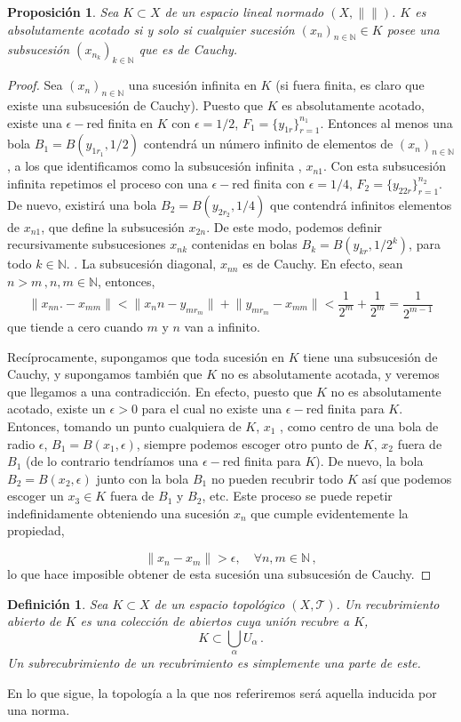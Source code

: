 \documentclass[12pt]{book}
\newtheorem{defn}{\bf Definición}[chapter]
\newtheorem{prop}{\bf Proposición}[chapter]
\def\NN{\mathbb{N}}
\newcommand{\norm}[1]{\lVert #1\rVert }
\begin{document}
\begin{prop} Sea $K\subset X$ de un espacio lineal normado $(X,\norm{})$.  $K$ es absolutamente 
acotado si y solo si cualquier sucesión $(x_n)_{n\in\NN}\in  K$ posee una subsucesión $
(x_{n_k})_{k\in \NN}$ que es de Cauchy.
\end{prop}
\begin{proof}
 Sea $(x_n)_{n\in\NN}$ una sucesión infinita en $K$ (si fuera finita, es claro que existe una 
subsucesión de Cauchy). Puesto que $K$ es absolutamente acotado, existe una $\epsilon-$red 
finita en $K$ con $\epsilon=1/2$, $F_1=\{y_{1r}\}_{r=1}^{n_1}$. Entonces al menos una bola 
$B_1=B(y_{1r_1},1/2)$ contendrá un número infinito de elementos de $(x_n)_{n\in\NN}$, a los que 
identificamos como la subsucesión infinita , $x_{n1}$. Con esta subsucesión infinita repetimos el 
proceso con una  $\epsilon-$red finita con $\epsilon=1/4$, $F_2=\{y_{2 2r}\}_{r=1}^{n_2}$. De 
nuevo, existirá una bola $B_2=B(y_{2r_2},1/4)$  que contendrá infinitos elementos de $x_{n1}$, 
que define la subsucesión $x_{2n}$. De este modo, podemos definir recursivamente  
subsucesiones $x_{nk}$ contenidas en bolas $B_k=B(y_{kr},1/2^k)$, para todo $k\in\NN$. . La 
subsucesión diagonal, $x_{nn}$ es de Cauchy. En efecto, sean $n>m\,,n,m\in \NN$, entonces,
 $$\norm{x_{nn}.-x_{mm}} <\norm{x_nn - y_{mr_m}} + \norm{y_{mr_m}  - x_{mm}}< \frac{1}{2^m}+
\frac{1}{2^m}=\frac{1}{2^{m-1}}$$
 que tiende a cero cuando $m$ y $n$ van a infinito.
 
 Recíprocamente, supongamos que toda sucesión en $K$ tiene una subsucesión de Cauchy, y 
supongamos también que $K$ no es absolutamente acotada, y veremos que llegamos a una 
contradicción. En efecto, puesto que $K$ no es absolutamente acotado, existe un $\epsilon>0$ 
para el cual  no existe una $\epsilon-$red finita para $K$.  Entonces, tomando un punto cualquiera 
de $K$,  $x_1$ , como centro de una bola de radio $\epsilon$, $B_1=B(x_1,\epsilon)$, siempre 
podemos escoger otro punto de $K$, $x_2$ fuera de $B_1$ (de lo contrario tendríamos una $
\epsilon-$red finita para $K$). De nuevo, la bola $B_2=B(x_2,\epsilon)$ junto con la bola $B_1$ no 
pueden recubrir todo $K$ así que podemos escoger un $x_3\in K$ fuera de $B_1$ y $B_2$, etc. 
Este proceso se puede repetir indefinidamente obteniendo una sucesión $x_n$ que cumple 
evidentemente la propiedad,

$$\norm{x_n-x_m}>\epsilon,\quad\forall n,m\in\NN\,,$$
lo que hace imposible obtener de esta sucesión una subsucesión de Cauchy.
\end{proof}
\begin{defn} Sea $K\subset X$ de un espacio topológico $(X,\mathcal{T})$. Un recubrimiento 
abierto de $K$ es una colección de abiertos cuya unión recubre a $K$,
$$K\subset  \bigcup_{\alpha} U_\alpha\,.$$
Un subrecubrimiento de un recubrimiento es simplemente una parte de este.
\end{defn}
En lo que sigue, la topología   a la que nos referiremos será  aquella inducida por una norma.
\end{document}
